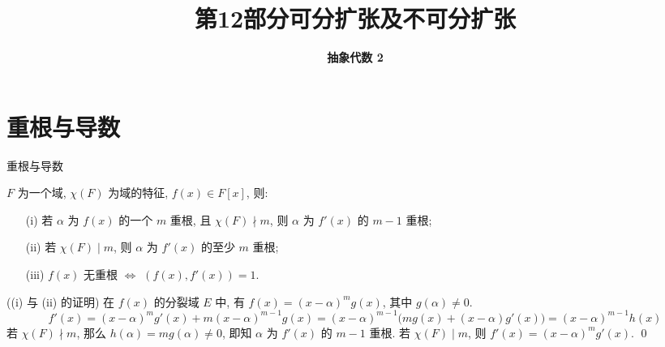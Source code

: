 \everymath{\displaystyle}



\title[可分扩张及不可分扩张]{\texorpdfstring{\LARGE \bfseries 第12部分\quad 可分扩张及不可分扩张}{第12部分 可分扩张及不可分扩张}}
\author[抽象代数 2]{\Large \bfseries 抽象代数 2}
\date{}





\begin{frame}

\titlepage %

\end{frame}


\section[重根]{重根与导数}


\begin{frame}{重根与导数}

\begin{lem}[重根与导数]
$F$ 为一个域, $\chi(F)$ 为域的特征, $f(x) \in F[x]$, 则:
\begin{itemize}
\item[(i)] 若 $\alpha$ 为 $f(x)$ 的一个 $m$ 重根, 且 $\chi(F) \nmid m$,
  则 $\alpha$ 为 $f'(x)$ 的 $m-1$ 重根;
\item[(ii)] 若 $\chi(F) \mid m$, 则 $\alpha$ 为 $f'(x)$ 的至少 $m$ 重根;
\item[(iii)] $f(x)$ 无重根 $\iff$ $(f(x), f'(x)) = 1$.
\end{itemize}
\end{lem}

\startproof[bg=yellow, fg=red]((i) 与 (ii) 的证明)
在 $f(x)$ 的分裂域 $E$ 中, 有 $f(x) = (x - \alpha)^m g(x)$, 其中 $g(\alpha) \neq 0$.
\[
f'(x) = (x - \alpha)^m g'(x) + m(x - \alpha)^{m-1} g(x)
= (x - \alpha)^{m-1} \big( m g(x) + (x - \alpha) g'(x) \big) = (x - \alpha)^{m-1} h(x)
\]
若 $\chi(F) \nmid m$, 那么 $h(\alpha) = m g(\alpha) \neq 0$,
即知 $\alpha$ 为 $f'(x)$ 的 $m-1$ 重根.
若 $\chi(F) \mid m$, 则 $f'(x) = (x - \alpha)^m g'(x)$.
\qed

\end{frame}

